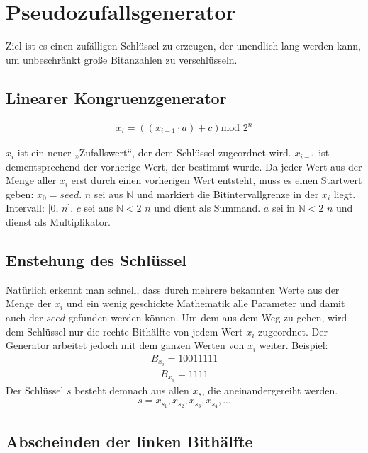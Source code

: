 \documentclass[10pt,a4paper]{article}
\begin{document}
\section{Pseudozufallsgenerator}

Ziel ist es einen \glqq zufälligen\grqq{} Schlüssel zu erzeugen, der unendlich lang werden kann, um unbeschränkt große Bitanzahlen zu verschlüsseln.

\subsection{Linearer Kongruenzgenerator}

\begin{align*}
    x_i=\left(\left( x_{i-1}\cdot a\right) +c\right) \text{mod } 2^n
\end{align*}

$x_i$ ist ein neuer „Zufallswert“, der dem Schlüssel zugeordnet wird.
$x_{i-1}$ ist dementsprechend der vorherige Wert, der bestimmt wurde.
Da jeder Wert aus der Menge aller $x_i$ erst durch einen vorherigen Wert entsteht, muss es einen Startwert geben: $x_0 = seed $.
$n$ sei aus $ \mathbb{N} $ und markiert die Bitintervallgrenze in der $x_i$ liegt.
Intervall: [0, $n$].
$c$ sei aus  $ \mathbb{N}<2 $
$n$ und dient als Summand.
$a$ sei in $ \mathbb{N}< 2 $
$n$ und dienst als Multiplikator.

\subsection{Enstehung des Schlüssel}

Natürlich erkennt man schnell, dass durch mehrere bekannten Werte aus der Menge der $x_i$ und ein wenig geschickte Mathematik alle Parameter und damit auch der $seed$ gefunden werden können.
Um dem aus dem Weg zu gehen, wird dem Schlüssel nur die rechte Bithälfte von jedem Wert $x_i$ zugeordnet.
Der Generator arbeitet jedoch mit dem ganzen Werten von $x_i$ weiter.
Beispiel:
\begin{align*}
    B_{x_i} = 1001 1111
\end{align*}
\begin{align*}
    B_{x_s} = 1111
\end{align*}
Der Schlüssel $s$ besteht demnach aus allen $x_s$, die aneinandergereiht werden.
\begin{align*}
    s = x_{s_1}, x_{s_2}, x_{s_3}, x_{s_4}, ...
\end{align*}

\subsection{Abscheinden der linken Bithälfte}
\end{document}
